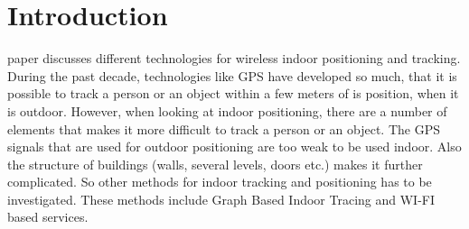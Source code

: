 \section{Introduction}

 paper discusses different technologies for wireless indoor positioning and tracking. 
During the past decade, technologies like GPS have developed so much, that it is possible to track a person or an object within a few meters of is position, when it is outdoor. 
However, when looking at indoor positioning, there are a number of elements that makes it more difficult to track a person or an object.
The GPS signals that are used for outdoor positioning are too weak to be used indoor. 
Also the structure of buildings (walls, several levels, doors etc.) makes it further complicated.
So other methods for indoor tracking and positioning has to be investigated. 
These methods include Graph Based Indoor Tracing and WI-FI based services. 




